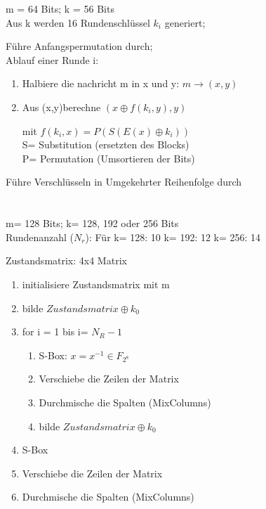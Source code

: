 \begin{multicols}{2}
m = 64 Bits; 	k = 56 Bits\\
Aus k werden 16 Rundenschlüssel $k_i$ generiert;

Führe Anfangspermutation durch;\\
Ablauf einer Runde i:
\begin{enumerate}
\item Halbiere die nachricht m in x und y: $m \to (x,y)$
\item  Aus (x,y)berechne $(x \oplus f(k_i,y),y)$

 mit $f(k_i,x) = P(S(E(x)\oplus k_i))$\\
	S= Substitution (ersetzten des Blocks)\\
	P= Permutation (Umsortieren der Bits)
\end{enumerate}

Führe Verschlüsseln in Umgekehrter Reihenfolge durch
\\ \\ \\
m= 128 Bits;	k= 128, 192 oder 256 Bits		\\
Rundenanzahl ($N_r$): Für k= 128: 10 k= 192: 12 k= 256: 14

Zustandsmatrix:  4x4 Matrix

\begin{enumerate}
\item initialisiere Zustandsmatrix mit m
\item bilde $Zustandsmatrix \oplus k_0$
\item for i = 1 bis i= $N_R-1$
\begin{enumerate}
\item 	S-Box: $x = x^{-1} \in F_{2^8}$
\item	Verschiebe die Zeilen der Matrix
\item 	Durchmische die Spalten (MixColumns)
\item 	bilde $Zustandsmatrix \oplus k_0$
\end{enumerate}
\item S-Box
\item Verschiebe die Zeilen der Matrix
\item Durchmische die Spalten (MixColumns)
\end{enumerate}


\end{multicols}

